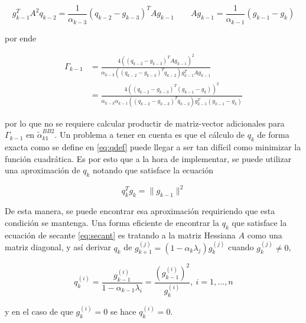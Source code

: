 \begin{equation*}
    g_{k-1}^TA^2q_{k-2} = \frac{1}{\alpha_{k-3}}(q_{k-2}-g_{k-3})^TAg_{k-1} \qquad Ag_{k-1}=\frac{1}{\alpha_{k-1}}(g_{k-1}-g_k)
\end{equation*}

por ende

\begin{align*}
    \Gamma_{k-1} & = \frac{4((q_{k-2}-g_{k-3})^TAg_{k-1})^2}{\alpha_{k-3}((q_{k-2}-g_{k-3})^Tq_{k-2})g_{k-1}^T Ag_{k-1}}                      \\
                 & = \frac{4((q_{k-2}-g_{k-3})^T(g_{k-1}-g_k))^2}{\alpha_{k-3}\alpha_{k-1}((q_{k-2}-g_{k-3})^Tq_{k-2})g_{k-1}^T(g_{k-1}-g_k)}
\end{align*}

por lo que no se requiere calcular productir de matriz-vector adicionales para $\Gamma_{k-1}$ en $\tilde{\alpha}_{k1}^{BB2}$.
Un problema a tener en cuenta es que el cálculo de $q_k$ de forma exacta como se define en \ref{eq:qdef} puede llegar a ser tan difícil como minimizar la función cuadrática. Es por esto que a la hora de implementar, se puede utilizar una aproximación de $q_k$ notando que satisface la ecuación

\begin{equation}
    q_k^Tg_k = \|g_{k-1}\|^2
    \label{eq:secant}
\end{equation}

De esta manera, se puede encontrar esa aproximación requiriendo que esta condición se mantenga. Una forma eficiente de encontrar la $q_k$ que satisface la ecuación de secante \ref{eq:secant} es tratando a la matriz Hessiana $A$ como una matriz diagonal, y así derivar $q_k$ de $g_{k+1}^{(j)} = (1-\alpha_k\lambda_j)g_k^{(j)}$ cuando $g_k^{(j)}\neq 0$,

\begin{equation}
    q_k^{(i)} = \frac{g_{k-1}^{(i)}}{1-\alpha_{k-1}\lambda_i} = \frac{(g_{k-1}^{(i)})^2}{g_k^{(i)}}, \ i=1, ..., n
\end{equation}

y en el caso de que $g_k^{(i)}=0$ se hace $q_k^{(i)}=0$.
